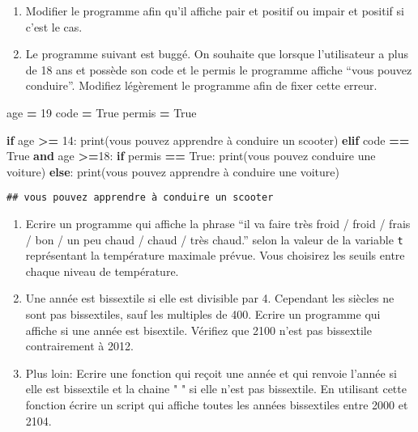 \documentclass[
]{book}
\newenvironment{Shaded}{\begin{snugshade}}{\end{snugshade}}
\newcommand{\BuiltInTok}[1]{#1}
\newcommand{\ControlFlowTok}[1]{\textcolor[rgb]{0.13,0.29,0.53}{\textbf{#1}}}
\newcommand{\DecValTok}[1]{\textcolor[rgb]{0.00,0.00,0.81}{#1}}
\newcommand{\KeywordTok}[1]{\textcolor[rgb]{0.13,0.29,0.53}{\textbf{#1}}}
\newcommand{\NormalTok}[1]{#1}
\newcommand{\OperatorTok}[1]{\textcolor[rgb]{0.81,0.36,0.00}{\textbf{#1}}}
\newcommand{\StringTok}[1]{\textcolor[rgb]{0.31,0.60,0.02}{#1}}
\newcommand{\VariableTok}[1]{\textcolor[rgb]{0.00,0.00,0.00}{#1}}
\providecommand{\tightlist}{%
  \setlength{\itemsep}{0pt}\setlength{\parskip}{0pt}}
\def\tightlist{}
\begin{document}
\begin{enumerate}
\def\labelenumi{\arabic{enumi}.}
\setcounter{enumi}{2}
\tightlist
\item
  Modifier le programme afin qu'il affiche pair et positif ou impair et positif si c'est le cas.
\item
  Le programme suivant est buggé. On souhaite que lorsque l'utilisateur a plus de 18 ans et possède son code et le permis le programme affiche ``vous pouvez conduire''. Modifiez légèrement le programme afin de fixer cette erreur.
\end{enumerate}

\begin{Shaded}
\begin{Highlighting}[]
\NormalTok{age }\OperatorTok{=} \DecValTok{19}
\NormalTok{code }\OperatorTok{=} \VariableTok{True}
\NormalTok{permis }\OperatorTok{=} \VariableTok{True}

\ControlFlowTok{if}\NormalTok{ age }\OperatorTok{\textgreater{}=} \DecValTok{14}\NormalTok{:}
    \BuiltInTok{print}\NormalTok{(}\StringTok{\textquotesingle{}vous pouvez apprendre à conduire un scooter\textquotesingle{}}\NormalTok{)}
\ControlFlowTok{elif}\NormalTok{ code }\OperatorTok{==} \VariableTok{True} \KeywordTok{and}\NormalTok{ age }\OperatorTok{\textgreater{}=}\DecValTok{18}\NormalTok{:}
    \ControlFlowTok{if}\NormalTok{ permis }\OperatorTok{==} \VariableTok{True}\NormalTok{:}
        \BuiltInTok{print}\NormalTok{(}\StringTok{\textquotesingle{}vous pouvez conduire une voiture\textquotesingle{}}\NormalTok{)}
    \ControlFlowTok{else}\NormalTok{:}
        \BuiltInTok{print}\NormalTok{(}\StringTok{\textquotesingle{}vous pouvez apprendre à conduire une voiture\textquotesingle{}}\NormalTok{)}
\end{Highlighting}
\end{Shaded}

\begin{verbatim}
## vous pouvez apprendre à conduire un scooter
\end{verbatim}

\begin{enumerate}
\def\labelenumi{\arabic{enumi}.}
\setcounter{enumi}{3}
\item
  Ecrire un programme qui affiche la phrase ``il va faire très froid / froid / frais / bon / un peu chaud / chaud / très chaud.'' selon la valeur de la variable \texttt{t} représentant la température maximale prévue. Vous choisirez les seuils entre chaque niveau de température.
\item
  Une année est bissextile si elle est divisible par 4. Cependant les siècles ne sont pas bissextiles, sauf les multiples de 400. Ecrire un programme qui affiche si une année est bisextile. Vérifiez que 2100 n'est pas bissextile contrairement à 2012.
\item
  Plus loin: Ecrire une fonction qui reçoit une année et qui renvoie l'année si elle est bissextile et la chaine " " si elle n'est pas bissextile. En utilisant cette fonction écrire un script qui affiche toutes les années bissextiles entre 2000 et 2104.
\end{enumerate}
\end{document}
